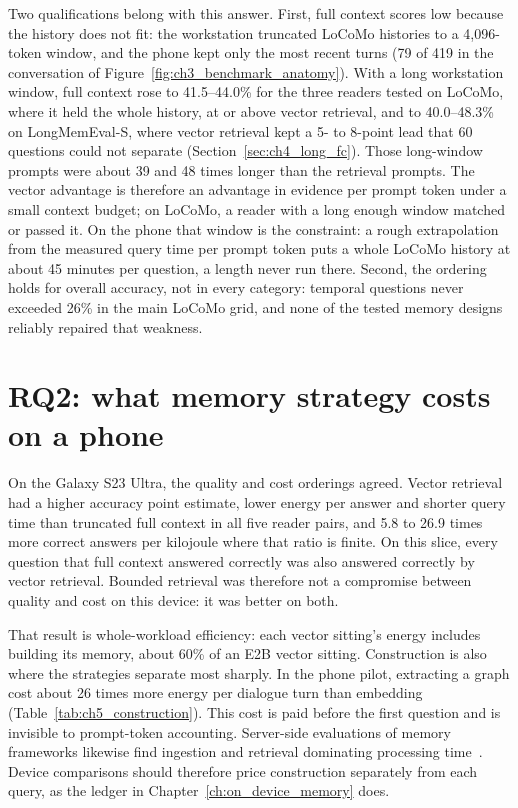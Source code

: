 Two qualifications belong with this answer. First, full context scores low because the history
does not fit: the workstation truncated LoCoMo histories to a 4,096-token window, and the phone kept
only the most recent turns (79 of 419 in the conversation of
Figure~\ref{fig:ch3_benchmark_anatomy}). With a long workstation window, full context rose to
41.5--44.0\% for the three readers tested on LoCoMo, where it held the whole history, at or above
vector retrieval, and to 40.0--48.3\% on LongMemEval-S, where vector retrieval kept a 5- to 8-point
lead that 60 questions could not separate (Section~\ref{sec:ch4_long_fc}). Those long-window
prompts were about 39 and 48 times longer than the retrieval prompts. The vector advantage is
therefore an advantage in evidence per prompt token under a small context budget; on LoCoMo, a
reader with a long enough window matched or passed it. On the phone that window is the constraint: a rough extrapolation from
the measured query time per prompt token puts a whole LoCoMo history at about 45 minutes per
question, a length never run there. Second, the ordering holds for overall
accuracy, not in every category: temporal questions never exceeded 26\% in the main LoCoMo grid,
and none of the tested memory designs reliably repaired that weakness.

\section{RQ2: what memory strategy costs on a phone}
\label{sec:ch9_rq2}

On the Galaxy S23 Ultra, the quality and cost orderings agreed. Vector retrieval had a higher
accuracy point estimate, lower energy per answer and shorter query time than truncated full
context in all five reader pairs, and 5.8 to 26.9 times more correct answers per kilojoule where
that ratio is finite. On this slice, every question that full context answered correctly was also answered correctly by
vector retrieval. Bounded retrieval was therefore not a compromise between quality and cost on this
device: it was better on both.

That result is whole-workload efficiency: each vector sitting's energy includes building its
memory, about 60\% of an E2B vector sitting. Construction is also where the strategies separate
most sharply. In the phone pilot, extracting a graph cost about 26 times more energy per dialogue
turn than embedding (Table~\ref{tab:ch5_construction}). This cost is paid before the first question
and is invisible to prompt-token accounting. Server-side evaluations of memory frameworks likewise find ingestion and
retrieval dominating processing time~\citep{ai_hippocampus}. Device comparisons should therefore price construction
separately from each query, as the ledger in Chapter~\ref{ch:on_device_memory} does.

